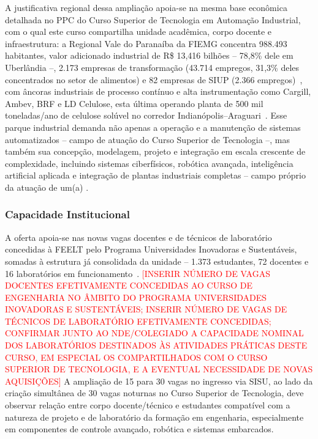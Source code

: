 A justificativa regional dessa ampliação apoia-se na mesma base econômica detalhada no PPC do Curso Superior de Tecnologia em Automação Industrial, com o qual este curso compartilha unidade acadêmica, corpo docente e infraestrutura: a Regional Vale do Paranaíba da FIEMG concentra 988.493 habitantes, valor adicionado industrial de R\$ 13,416 bilhões -- 78,8\% dele em Uberlândia --, 2.173 empresas de transformação (43.714 empregos, 31,3\% deles concentrados no setor de alimentos) e 82 empresas de SIUP (2.366 empregos)~\cite{fiemg_painel_vale_paranaiba_2026}, com âncoras industriais de processo contínuo e alta instrumentação como Cargill, Ambev, BRF e LD Celulose, esta última operando planta de 500 mil toneladas/ano de celulose solúvel no corredor Indianópolis--Araguari~\cite{cargill_uberlandia_investimento,ambev_uberlandia_investimento_2025,brf_uberlandia_unidade,ld_celulose_planta}. Esse parque industrial demanda não apenas a operação e a manutenção de sistemas automatizados -- campo de atuação do Curso Superior de Tecnologia --, mas também sua concepção, modelagem, projeto e integração em escala crescente de complexidade, incluindo sistemas ciberfísicos, robótica avançada, inteligência artificial aplicada e integração de plantas industriais completas -- campo próprio da atuação de um(a) \ppctitulacao.

\subsubsection{Capacidade Institucional}

A oferta apoia-se nas novas vagas docentes e de técnicos de laboratório concedidas à FEELT pelo Programa Universidades Inovadoras e Sustentáveis, somadas à estrutura já consolidada da unidade -- 1.373 estudantes, 72 docentes e 16 laboratórios em funcionamento~\cite{feelt_numeros}. \textcolor{red}{[INSERIR NÚMERO DE VAGAS DOCENTES EFETIVAMENTE CONCEDIDAS AO CURSO DE ENGENHARIA NO ÂMBITO DO PROGRAMA UNIVERSIDADES INOVADORAS E SUSTENTÁVEIS; INSERIR NÚMERO DE VAGAS DE TÉCNICOS DE LABORATÓRIO EFETIVAMENTE CONCEDIDAS; CONFIRMAR JUNTO AO NDE/COLEGIADO A CAPACIDADE NOMINAL DOS LABORATÓRIOS DESTINADOS ÀS ATIVIDADES PRÁTICAS DESTE CURSO, EM ESPECIAL OS COMPARTILHADOS COM O CURSO SUPERIOR DE TECNOLOGIA, E A EVENTUAL NECESSIDADE DE NOVAS AQUISIÇÕES]} A ampliação de 15 para 30 vagas no ingresso via SISU, ao lado da criação simultânea de 30 vagas noturnas no Curso Superior de Tecnologia, deve observar relação entre corpo docente/técnico e estudantes compatível com a natureza de projeto e de laboratório da formação em engenharia, especialmente em componentes de controle avançado, robótica e sistemas embarcados.

